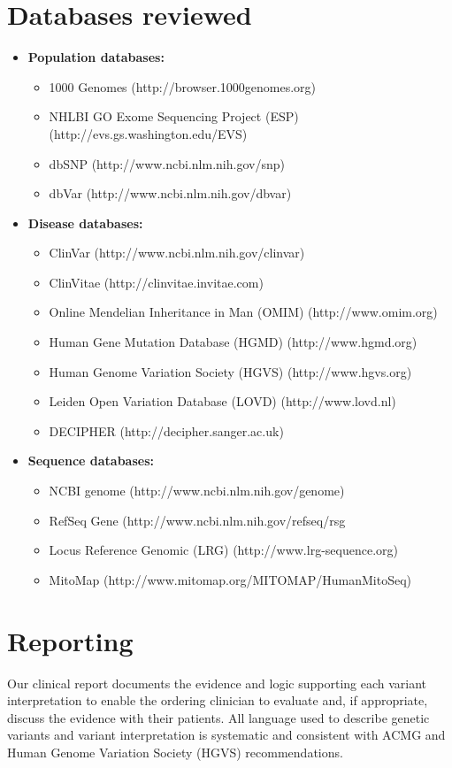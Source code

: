 \documentclass[9pt,a4paper]{article}
\begin{document}
\section*{{\color{invitae}Databases reviewed \leaders\vrule height 2.5pt depth -1.5pt \hfill \null}}
 
\begin{itemize}[leftmargin=0.4cm]
 \item \textbf{Population databases: }
 \begin{itemize}
  \item 1000 Genomes (http://browser.1000genomes.org)
  \item NHLBI GO Exome Sequencing Project (ESP) (http://evs.gs.washington.edu/EVS)
  \item dbSNP (http://www.ncbi.nlm.nih.gov/snp)
  \item dbVar (http://www.ncbi.nlm.nih.gov/dbvar)
 \end{itemize}
 \item \textbf{Disease databases: }
 \begin{itemize}
  \item ClinVar (http://www.ncbi.nlm.nih.gov/clinvar)
  \item ClinVitae (http://clinvitae.invitae.com)
  \item Online Mendelian Inheritance in Man (OMIM) (http://www.omim.org)
  \item Human Gene Mutation Database (HGMD) (http://www.hgmd.org)
  \item Human Genome Variation Society (HGVS) (http://www.hgvs.org)
  \item Leiden Open Variation Database (LOVD) (http://www.lovd.nl)
  \item DECIPHER (http://decipher.sanger.ac.uk)
 \end{itemize}
 \item \textbf{Sequence databases: }
 \begin{itemize}
  \item NCBI genome (http://www.ncbi.nlm.nih.gov/genome)
  \item RefSeq Gene (http://www.ncbi.nlm.nih.gov/refseq/rsg
  \item Locus Reference Genomic (LRG) (http://www.lrg-sequence.org)
  \item MitoMap (http://www.mitomap.org/MITOMAP/HumanMitoSeq)
 \end{itemize}
\end{itemize}

\section*{{\color{invitae}Reporting \leaders\vrule height 2.5pt depth -1.5pt \hfill \null}}
Our clinical report documents the evidence and logic supporting each variant interpretation to enable the ordering clinician to evaluate and, if appropriate, discuss the evidence with their patients. All language used to describe genetic variants and variant interpretation is systematic and consistent with ACMG and Human Genome Variation Society (HGVS) recommendations. \\
 
\end{document}

